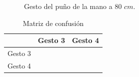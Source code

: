 \begin{figure}[h!]
\caption{Gesto del puño de la mano a $80$ $cm$.} \label{fig:G2I0}
\end{figure}

\begin{table}[h!] 
\begin{center}
\begin{tabular}{ r || c | c |} 
 
        & Gesto 3 & Gesto 4 \\ \hline \hline  
Gesto 3 &      &      \\ \hline  
Gesto 4 &      &       \\   

\end{tabular}
\end{center} 
\caption{Matriz de confusión}
\end{table}

